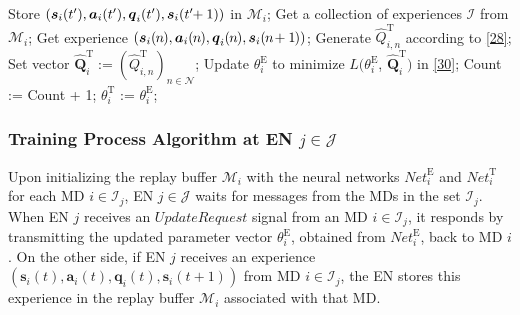 \documentclass[10pt, journal,letterpaper]{IEEEtran}
\begin{document}
\begin{algorithm}[tbp]
\begin{algorithmic}[1]
		\State Store $(\boldsymbol{s}_i(t'), \boldsymbol{a}_i(t'), \boldsymbol{q}_i(t'), \boldsymbol{s}_i(t'\hspace{-1mm}+1))$ in $\mathcal{M}_i$;
		\State Get a collection of experiences  $\mathcal{I}$ from $\mathcal{M}_i$; 
		\State Get experience $(\boldsymbol{s}_i(\hspace{-0.2mm}n\hspace{-0.2mm}), \boldsymbol{a}_i(\hspace{-0.2mm}n\hspace{-0.2mm}), \boldsymbol{q}_i(\hspace{-0.2mm}n\hspace{-0.2mm}), \boldsymbol{s}_i(\hspace{-0.2mm}n\hspace{-0.5mm}+1\hspace{-0.2mm}))$; 
		\State Generate $\hat{Q}_{i,n}^{\text{T}}$ according to   \eqref{28};
		\EndFor
		\State Set vector  $\hat{\mathbf{Q}}_i^{\text{T}} := (\hat{Q}^{\text{T}}_{i,n})_{n \in \mathcal{N}}$;
		\State Update $\theta_i^{\text{E}}$ to minimize $L(\theta_i^{\text{E}}$, $\hat{\mathbf{Q}}_i^{\text{T}})$ in   \eqref{30};
		\State Count := Count + 1;
		\State $\theta_i^{\text{T}}$ := $\theta_i^{\text{E}}$;
		\EndIf
		\EndIf
		\EndWhile
		
	\end{algorithmic}
\end{algorithm}


\subsubsection{Training Process Algorithm at EN $j \in \mathcal{J}$}
Upon initializing the replay buffer $\mathcal{M}_i$ with the neural networks $\textit{Net}_i^{\text{E}}$ and $\textit{Net}_i^{\text{T}}$ for each MD $i \in \mathcal{I}_j$, EN $j \in \mathcal{J}$ waits for messages from the MDs in the set $\mathcal{I}_j$. When EN $j$ receives an $\textit{UpdateRequest}$ signal from an MD $i \in \mathcal{I}_j$, it responds by transmitting the updated parameter vector $\theta^{\text{E}}_i$, obtained from $\textit{Net}_i^{\text{E}}$, back to MD $i$. On the other side, if EN $j$ receives an experience $(\boldsymbol{s}_i(t), \boldsymbol{a}_i(t), \boldsymbol{q}_i(t), \boldsymbol{s}_i(t+1))$ from MD $i \in \mathcal{I}_j$, the EN stores this experience in the replay buffer $\mathcal{M}_i$ associated with that MD. %
\end{document}
